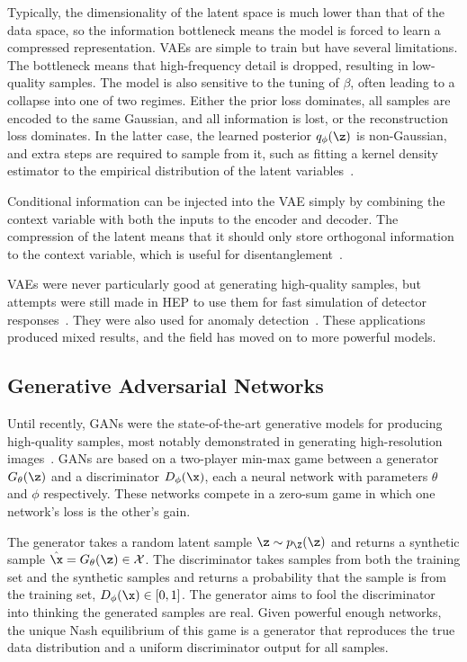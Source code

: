 Typically, the dimensionality of the latent space is much lower than that of the data space, so the information bottleneck means the model is forced to learn a compressed representation.
VAEs are simple to train but have several limitations.
The bottleneck means that high-frequency detail is dropped, resulting in low-quality samples.
The model is also sensitive to the tuning of $\beta$, often leading to a collapse into one of two regimes.
Either the prior loss dominates, all samples are encoded to the same Gaussian, and all information is lost, or the reconstruction loss dominates.
In the latter case, the learned posterior $q_\phi(\z)$ is non-Gaussian, and extra steps are required to sample from it, such as fitting a kernel density estimator to the empirical distribution of the latent variables~\cite{KDEVAE}.

Conditional information can be injected into the VAE simply by combining the context variable with both the inputs to the encoder and decoder.
The compression of the latent means that it should only store orthogonal information to the context variable, which is useful for disentanglement~\cite{cVAE}.

VAEs were never particularly good at generating high-quality samples, but attempts were still made in HEP to use them for fast simulation of detector responses~\cite{VariationalAutoencodersJet, GraphVariationalAutoencoder, ParticlebasedFastJet}.
They were also used for anomaly detection~\cite{VariationalAutoencodersAnomalous, DeepSetVAE, MassiveIssueAnomaly}.
These applications produced mixed results, and the field has moved on to more powerful models.

\subsection{Generative Adversarial Networks}

Until recently, GANs were the state-of-the-art generative models for producing high-quality samples, most notably demonstrated in generating high-resolution images~\cite{StyleGAN2, StyleGAN3}.
GANs are based on a two-player min-max game between a generator $G_\theta(\z)$ and a discriminator $D_\phi(\x)$, each a neural network with parameters $\theta$ and $\phi$ respectively.
These networks compete in a zero-sum game in which one network's loss is the other's gain.

The generator takes a random latent sample $\z \sim p_\Z(\z)$ and returns a synthetic sample $\hat{\x} = G_\theta(\z) \in \mathcal{X}$.
The discriminator takes samples from both the training set and the synthetic samples and returns a probability that the sample is from the training set, $D_\phi(\x) \in [0, 1]$.
The generator aims to fool the discriminator into thinking the generated samples are real.
Given powerful enough networks, the unique Nash equilibrium of this game is a generator that reproduces the true data distribution and a uniform discriminator output for all samples.

